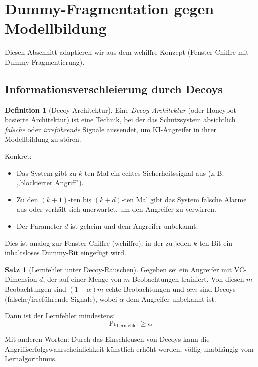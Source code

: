 \documentclass[a4paper,12pt]{article}
\theoremstyle{definition}
\newtheorem{definition}{Definition}
\newtheorem{satz}{Satz}
\begin{document}
\section{Dummy-Fragmentation gegen Modellbildung}

Diesen Abschnitt adaptieren wir aus dem wchiffre-Konzept (Fenster-Chiffre mit Dummy-Fragmentierung).

\subsection{Informationsverschleierung durch Decoys}

\begin{definition}[Decoy-Architektur]
\label{def:decoy_architektur}
Eine \emph{Decoy-Architektur} (oder Honeypot-basierte Architektur) ist eine Technik, bei der das Schutzsystem absichtlich \emph{falsche} oder \emph{irreführende} Signale aussendet, um KI-Angreifer in ihrer Modellbildung zu stören.

Konkret:
\begin{itemize}
	\item Das System gibt zu $k$-ten Mal ein echtes Sicherheitssignal aus (z.\,B. „blockierter Angriff").
	\item Zu den $(k+1)$-ten bis $(k+d)$-ten Mal gibt das System falsche Alarme aus oder verhält sich unerwartet, um den Angreifer zu verwirren.
	\item Der Parameter $d$ ist geheim und dem Angreifer unbekannt.
\end{itemize}

Dies ist analog zur Fenster-Chiffre (wchiffre), in der zu jeden $k$-ten Bit ein inhaltsloses Dummy-Bit eingefügt wird.
\end{definition}

\begin{satz}[Lernfehler unter Decoy-Rauschen]
\label{satz:decoy_lernfehler}
Gegeben sei ein Angreifer mit VC-Dimension $d$, der auf einer Menge von $m$ Beobachtungen trainiert. Von diesen $m$ Beobachtungen sind $(1 - \alpha)m$ echte Beobachtungen und $\alpha m$ sind Decoys (falsche/irreführende Signale), wobei $\alpha$ dem Angreifer unbekannt ist.

Dann ist der Lernfehler mindestens:
\begin{equation}
\mathrm{Pr}_{\text{Lernfehler}} \geq \alpha
\end{equation}

Mit anderen Worten: Durch das Einschleusen von Decoys kann die Angriffserfolgswahrscheinlichkeit künstlich erhöht werden, völlig unabhängig vom Lernalgorithmus.
\end{satz}
\end{document}
